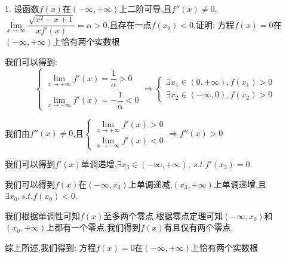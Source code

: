 1. 设函数$f(x)$在$(-\infty,+\infty)$上二阶可导,且$f''(x)\neq 0$,$\lim\limits_{x\rightarrow \infty}\dfrac{\sqrt{x^2-x+1}}{xf'(x)}=\alpha>0$,且存在一点$f(x_{0})<0$,证明:  方程$f(x)=0$在$(-\infty,+\infty)$上恰有两个实数根
\begin{solution}

	我们可以得到:  $$\left\lbrace
	\begin{array}{l}
		\lim\limits_{x\rightarrow+\infty}f'(x)=\dfrac{1}{\alpha}>0\\
		\lim\limits_{x\rightarrow-\infty}f'(x)=-\dfrac{1}{\alpha}<0
	\end{array}
	\right. \Rightarrow\left\lbrace
	\begin{array}{l}
		\exists x_{1}\in(0,+\infty),f(x_{1})>0\\
		\exists x_{2}\in(-\infty,0),f(x_{2})>0
	\end{array}
	\right. $$
	
	我们由$f''(x)\neq 0$,且$\left\lbrace
	\begin{array}{l}
		\lim\limits_{x\rightarrow+\infty}f'(x)>0\\
		\lim\limits_{x\rightarrow-\infty}f'(x)<0
	\end{array}
	\right. \Rightarrow f''(x)>0$
	
	我们可以得到$f'(x)$单调递增,$\exists x_{3}\in(-\infty,+\infty),\ s.t. f'(x_{3})=0$.
	
	我们可以得到$f(x)$在$(-\infty,x_{3})$上单调递减,$(x_{3},+\infty)$上单调递增,且$\exists x_{0},s.t. f(x_{0})<0$.
	
	我们根据单调性可知$f(x)$至多两个零点,根据零点定理可知$(-\infty,x_{0})$和$(x_{0},+\infty)$上都有一个零点,我们得到$f(x)$有且仅有两个零点.
	
	综上所述,我们得到:  方程$f(x)=0$在$(-\infty,+\infty)$上恰有两个实数根
\end{solution}

